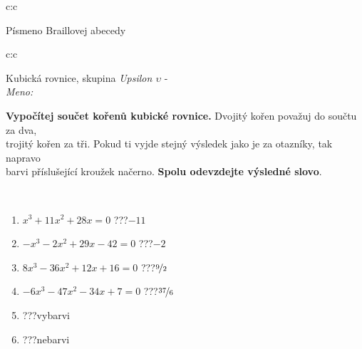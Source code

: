 \documentclass[10pt]{report}
\begin{document}
\begin{tabular}{c:c}
\begin{minipage}[c][104.5mm][t]{0.5\linewidth}
\begin{center}
\begin{minipage}{0.20\linewidth}
\begin{center}
{\small Písmeno Braillovej abecedy}
\end{center}
\end{minipage}
\end{center}
\end{minipage}
%
\end{tabular}
\newpage
\thispagestyle{empty}
\begin{tabular}{c:c}
\begin{minipage}[c][104.5mm][t]{0.5\linewidth}
\begin{center}
\vspace{7mm}
{\huge Kubická rovnice, skupina \textit{Upsilon $\upsilon$} -}\\[5mm]
\textit{Meno:}\phantom{xxxxxxxxxxxxxxxxxxxxxxxxxxxxxxxxxxxxxxxxxxxxxxxxxxxxxxxxxxxxxxxxx}\\[5mm]
\begin{minipage}{0.95\linewidth}
\textbf{Vypočítej součet kořenů kubické rovnice.} Dvojitý kořen považuj do součtu za dva,\\trojitý kořen za tři. Pokud ti vyjde stejný výsledek jako je za otazníky, tak napravo\\barvi příslušející kroužek načerno. \textbf{Spolu odevzdejte výsledné slovo}.
\end{minipage}
\\[1mm]
\begin{minipage}{0.79\linewidth}
\begin{center}
\begin{varwidth}{\linewidth}
\begin{enumerate}
\Large
\item $x^3+11x^2+28x=0$\quad \dotfill\; ???\;\dotfill \quad $-11$
\item $-x^3-2x^2+29x-42=0$\quad \dotfill\; ???\;\dotfill \quad $-2$
\item $8x^3-36x^2+12x+16=0$\quad \dotfill\; ???\;\dotfill \quad $\nicefrac{9}{2}$
\item $-6x^3-47x^2-34x+7=0$\quad \dotfill\; ???\;\dotfill \quad $\nicefrac{37}{6}$
\item \quad \dotfill\; ???\;\dotfill \quad vybarvi
\item \quad \dotfill\; ???\;\dotfill \quad nebarvi
\end{enumerate}
\end{varwidth}
\end{center}
\end{minipage}
\begin{minipage}{0.20\linewidth}
\begin{center}

\end{center}
\end{minipage}
\end{center}
\end{minipage}
\end{tabular}
\end{document}
